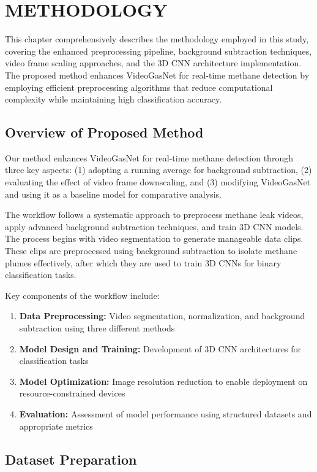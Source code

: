 \chapter{METHODOLOGY}

This chapter comprehensively describes the methodology employed in this study, covering the enhanced preprocessing pipeline, background subtraction techniques, video frame scaling approaches, and the 3D CNN architecture implementation. The proposed method enhances VideoGasNet for real-time methane detection by employing efficient preprocessing algorithms that reduce computational complexity while maintaining high classification accuracy.

\section{Overview of Proposed Method}

Our method enhances VideoGasNet for real-time methane detection through three key aspects: (1) adopting a running average for background subtraction, (2) evaluating the effect of video frame downscaling, and (3) modifying VideoGasNet and using it as a baseline model for comparative analysis.

The workflow follows a systematic approach to preprocess methane leak videos, apply advanced background subtraction techniques, and train 3D CNN models. The process begins with video segmentation to generate manageable data clips. These clips are preprocessed using background subtraction to isolate methane plumes effectively, after which they are used to train 3D CNNs for binary classification tasks.

Key components of the workflow include:

\begin{enumerate}
\item \textbf{Data Preprocessing:} Video segmentation, normalization, and background subtraction using three different methods
\item \textbf{Model Design and Training:} Development of 3D CNN architectures for classification tasks
\item \textbf{Model Optimization:} Image resolution reduction to enable deployment on resource-constrained devices
\item \textbf{Evaluation:} Assessment of model performance using structured datasets and appropriate metrics
\end{enumerate}

\section{Dataset Preparation}

